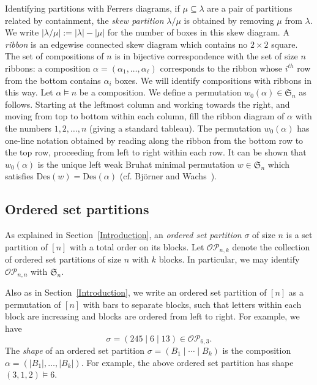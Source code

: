 \documentclass[10pt]{amsart}
\theoremstyle{definition}
\newcommand{\Des}{{\mathrm {Des}}}
\newcommand{\symm}{{\mathfrak{S}}}
\newcommand{\OP}{{\mathcal{OP}}}
\begin{document}
Identifying partitions with Ferrers diagrams, if $\mu \subseteq \lambda$ are a pair of partitions related by 
containment, the \emph{skew partition} $\lambda/\mu$ is obtained by removing $\mu$ from $\lambda$.
We write $|\lambda/\mu| := |\lambda| - |\mu|$ for the number of boxes in this skew diagram.
A \emph{ribbon} is an edgewise connected skew diagram which contains no $2 \times 2$ square.
The set of compositions of $n$ is in bijective correspondence with the set of size $n$ ribbons: a composition
$\alpha = (\alpha_1, \dots, \alpha_{\ell})$ corresponds to the ribbon whose $i^{th}$ row from the bottom
contains $\alpha_i$ boxes.  We will identify compositions with ribbons in this way.
Let $\alpha \models n$ be a composition.  We define a permutation $w_0(\alpha) \in \symm_n$ as follows.
Starting at the leftmost column and working towards the right, and moving from top to bottom within each column, fill the 
ribbon diagram of $\alpha$ with the numbers $1, 2, \dots, n$ (giving a standard tableau).
The permutation $w_0(\alpha)$ has one-line notation obtained by reading along the ribbon from the bottom row to the top row, proceeding from left to right within each row.  
It can be shown that $w_0(\alpha)$ is the unique left weak Bruhat minimal permutation $w \in \symm_n$ which
satisfies $\Des(w) = \Des(\alpha)$ (cf. Bj\"orner and Wachs~\cite{BjornerWachs}).
\subsection{Ordered set partitions}
As explained in Section~\ref{Introduction},
an \emph{ordered set partition} $\sigma$ of size $n$ is a set partition of $[n]$ with a total order on its blocks.
Let $\OP_{n,k}$ denote the collection of ordered set 
partitions of size $n$ with $k$ blocks.  
In particular, we may identify $\OP_{n,n}$ with $\symm_n$.

Also as in Section~\ref{Introduction},
we write an ordered set partition of $[n]$ as a permutation of $[n]$ with bars to separate blocks, such that letters within each block are increasing and blocks are ordered from left to right.
For example, we have
\begin{equation*}
\sigma = (245 \mid 6 \mid 13) \in \OP_{6,3}.
\end{equation*}
The \emph{shape} of an ordered set partition $\sigma = (B_1 \mid \cdots \mid B_k)$ is
the composition $\alpha = (|B_1|, \dots, |B_k|)$.  For example, the above ordered set partition has shape $(3,1,2) \models 6$.
\end{document}
